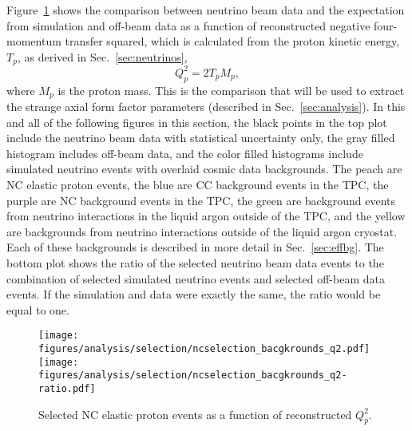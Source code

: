     Figure~\ref{fig:nceq2} shows the comparison between neutrino beam data and
    the expectation from simulation and off-beam data as a function of
    reconstructed negative four-momentum transfer squared, which is calculated
    from the proton kinetic energy, $T_p$, as derived in
    Sec.~\ref{sec:neutrinos},
    \begin{equation*}
      Q_p^2 = 2 T_p M_p,
    \end{equation*}
    where $M_p$ is the proton mass.  This is the comparison that will be used
    to extract the strange axial form factor parameters (described in
    Sec.~\ref{sec:analysis}). In this and all of the following figures in this
    section, the black points in the top plot include the neutrino beam data
    with statistical uncertainty only, the gray filled histogram includes
    off-beam data, and the color filled histograms include simulated neutrino
    events with overlaid cosmic data backgrounds. The peach are NC elastic
    proton events, the blue are CC background events in the TPC, the purple are
    NC background events in the TPC, the green are background events from
    neutrino interactions in the liquid argon outside of the TPC, and the
    yellow are backgrounds from neutrino interactions outside of the liquid
    argon cryostat. Each of these backgrounds is described in more detail in
    Sec.~\ref{sec:effbg}. The bottom plot shows the ratio of the selected
    neutrino beam data events to the combination of selected simulated neutrino
    events and selected off-beam data events. If the simulation and data were
    exactly the same, the ratio would be equal to one.
    
    \begin{figure}[ht]
      \centering
      \texttt{[image: figures/analysis/selection/ncselection\_bacgkrounds\_q2.pdf]} \\
      \texttt{[image: figures/analysis/selection/ncselection\_bacgkrounds\_q2-ratio.pdf]} \\
      \caption{Selected NC elastic proton events as a function of reconstructed $Q_p^2$.}
      \label{fig:nceq2}
    \end{figure}

